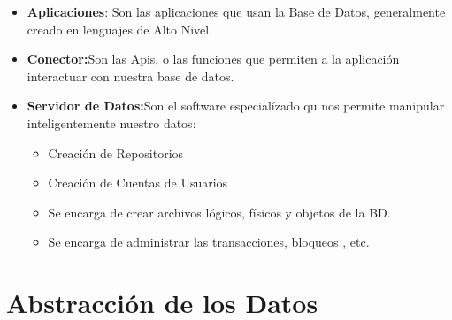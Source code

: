 \documentclass[12pt, fleqn]{report}                             %
\begin{document}
            \begin{itemize}
                \item
                    \textbf{Aplicaciones}: Son las aplicaciones que usan la Base de Datos, generalmente creado
                    en lenguajes de Alto Nivel.

                \item
                    \textbf{Conector:}Son las Apis, o las funciones que permiten a la aplicación interactuar
                    con nuestra base de datos.

                \item
                    \textbf{Servidor de Datos:}Son el software especialízado qu nos permite manipular
                    inteligentemente nuestro datos:

                    \begin{itemize}
                        \item Creación de Repositorios
                        \item Creación de Cuentas de Usuarios
                        \item Se encarga de crear archivos lógicos, físicos y objetos de la BD.
                        \item Se encarga de administrar las transacciones, bloqueos , etc.
                    \end{itemize}

            \end{itemize}




        \clearpage
        \section{Abstracción de los Datos}
\end{document}
